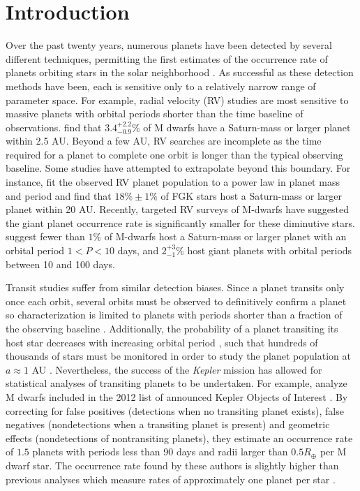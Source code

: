 \section{Introduction}

Over the past twenty years, numerous planets have been detected by several different techniques, permitting the first estimates of the occurrence rate of planets orbiting stars in the solar neighborhood \citep[e.g.][]{Gould10, Howard10b, Johnson10b, Vigan12}. As successful as these detection methods have been, each is sensitive only to a relatively narrow range of parameter space. For example, radial velocity (RV) studies are most sensitive to massive planets with orbital periods shorter than the time baseline of observations. %
\citet{Johnson10b} find that $3.4^{+2.2}_{-0.9}\%$ of M dwarfs have a Saturn-mass or larger planet within 2.5 AU. Beyond a few AU, RV searches are incomplete as the time required for a planet to complete one orbit is longer than the typical observing baseline. Some studies have attempted to extrapolate beyond this boundary. For instance, \citet{Cumming08} fit the observed RV planet population to a power law in planet mass and period and find that $18\% \pm 1\%$ of FGK stars host a Saturn-mass or larger planet within 20 AU. Recently, targeted RV surveys of M-dwarfs have suggested the giant planet occurrence rate is significantly smaller for these diminutive stars. \citet{Bonfils13} suggest fewer than $1\%$ of M-dwarfs host a Saturn-mass or larger planet with an orbital period $1 < P < 10$ days, and $2^{+3}_{-1}\%$ host giant planets with orbital periods between 10 and 100 days.

Transit studies suffer from similar detection biases. Since a planet transits only once each orbit, several orbits must be observed to definitively confirm a planet so characterization is limited to planets with periods shorter than a fraction of the observing baseline \citep{Gaudi05}. Additionally, the probability of a planet transiting its host star decreases with increasing orbital period \citep{Winn11}, such that hundreds of thousands of stars must be monitored in order to study the planet population at $a \approx 1$ AU \citep{Borucki84}. Nevertheless, the success of the \textit{Kepler} mission \citep{Borucki10, Koch10} has allowed for statistical analyses of transiting planets to be undertaken. For example, \citet{Morton14} analyze M dwarfs included in the 2012 list of announced Kepler Objects of Interest \citep[KOIs,][]{Batalha13}. By correcting for false positives (detections when no transiting planet exists), false negatives (nondetections when a transiting planet is present) and geometric effects (nondetections of nontransiting planets), they estimate an occurrence rate of $1.5$ planets with periods less than 90 days and radii larger than $0.5R_\oplus$ per M dwarf star. The occurrence rate found by these authors is slightly higher than previous analyses which measure rates of approximately one planet per star \citep{Youdin11, Mann12, Dressing13, Swift13}.

